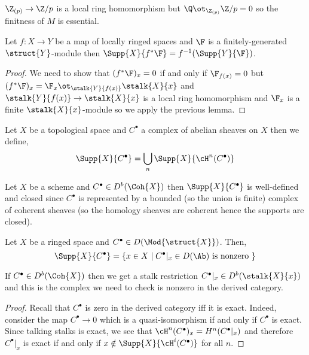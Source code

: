 \documentclass[12pt]{article}
\begin{document}
\begin{example}
$\Z_{(p)} \to \Z / p$ is a local ring homomorphism but $\Q \ot_{\Z_{(p)}} \Z / p = 0$ so the finitness of $M$ is essential.
\end{example}

\begin{prop}
Let $f : X \to Y$ be a map of locally ringed spaces and $\F$ is a finitely-generated $\struct{Y}$-module then $\Supp{X}{f^* \F} = f^{-1}(\Supp{Y}{\F})$.
\end{prop}

\begin{proof}
We need to show that $(f^* \F)_x = 0$ if and only if $\F_{f(x)} = 0$ but $(f^* \F)_x = \F_x \ot_{\stalk{Y}{f(x)}} \stalk{X}{x}$ and $\stalk{Y}{f(x)} \to \stalk{X}{x}$ is a local ring homomorphism and $\F_x$ is a finite $\stalk{X}{x}$-module so we apply the previous lemma.
\end{proof}

\begin{defn}
Let $X$ be a topological space and $C^\bullet$ a complex of abelian sheaves on $X$ then we define,
\[ \Supp{X}{C^\bullet} = \bigcup_n \Supp{X}{\cH^n(C^\bullet)} \]
\end{defn}

\begin{rmk}
Let $X$ be a scheme and $C^\bullet \in D^b(\Coh{X})$ then $\Supp{X}{C^\bullet}$ is well-defined and closed since $C^\bullet$ is represented by a bounded (so the union is finite) complex of coherent sheaves (so the homology sheaves are coherent hence the supports are closed).
\end{rmk}

\begin{prop}
Let $X$ be a ringed space and $C^\bullet \in D(\Mod{\struct{X}})$. Then,
\[ \Supp{X}{C^\bullet} = \{ x \in X \mid C^\bullet|_x \in D(\Ab) \text{ is nonzero } \} \]
\end{prop}

\begin{rmk}
If $C^\bullet \in D^b(\Coh{X})$ then we get a stalk restriction $C^\bullet|_x \in D^b(\stalk{X}{x})$ and this is the complex we need to check is nonzero in the derived category.
\end{rmk}

\begin{proof}
Recall that $C^\bullet$ is zero in the derived category iff it is exact. Indeed, consider the map $C^\bullet \to 0$ which is a quasi-isomorphism if and only if $C^\bullet$ is exact. Since talking stalks is exact, we see that $\cH^n(C^\bullet)_x = H^n(C^\bullet|_x)$ and therefore $C^\bullet|_x$ is exact if and only if $x \notin \Supp{X}{\cH^i(C^\bullet)}$ for all $n$.
\end{proof}
\end{document}
